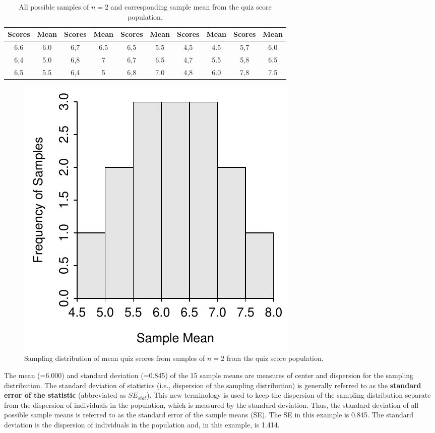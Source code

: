 \documentclass[10pt,openany]{book}\usepackage[]{graphicx}\usepackage[]{color}
\newenvironment{knitrout}{}{} %
\begin{document}
\begin{table}[htbp]
  \caption{All possible samples of $n=2$ and corresponding sample mean from the quiz score population.}
  \label{tab:SDistQuiz2}
  \centering
    \begin{tabular}{cc||cc||cc||cc||cc}
\hline\hline
Scores & Mean & Scores & Mean & Scores &  Mean & Scores & Mean & Scores & Mean \\
\hline
6,6 & 6.0 & 6,7 & 6.5 & 6,5 & 5.5 & 4,5 & 4.5 & 5,7 & 6.0 \\
6,4 & 5.0 & 6,8 & 7 & 6,7 & 6.5 & 4,7 & 5.5 & 5,8 & 6.5 \\
6,5 & 5.5 & 6,4 & 5 & 6,8 & 7.0 & 4,8 & 6.0 & 7,8 & 7.5 \\
\hline\hline
    \end{tabular}
\end{table}

\begin{knitrout}
\color{fgcolor}\begin{figure}[hbtp]

{\centering \includegraphics[width=.4\linewidth]{Figs/SDistQuiz2-1} 

}

\caption[Sampling distribution of mean quiz scores from samples of $n=2$ from the quiz score population]{Sampling distribution of mean quiz scores from samples of $n=2$ from the quiz score population.}\label{fig:SDistQuiz2}
\end{figure}


\end{knitrout}

\vspace{-12pt}
The mean (=6.000) and standard deviation (=0.845) of the 15 sample means are measures of center and dispersion for the sampling distribution. The standard deviation of statistics (i.e., dispersion of the sampling distribution) is generally referred to as the \textbf{standard error of the statistic} (abbreviated as $SE_{stat}$). This new terminology is used to keep the dispersion of the sampling distribution separate from the dispersion of individuals in the population, which is measured by the standard deviation. Thus, the standard deviation of all possible sample means is referred to as the standard error of the sample means (SE). The SE in this example is 0.845. The standard deviation is the dispersion of individuals in the population and, in this example, is 1.414.
\end{document}
